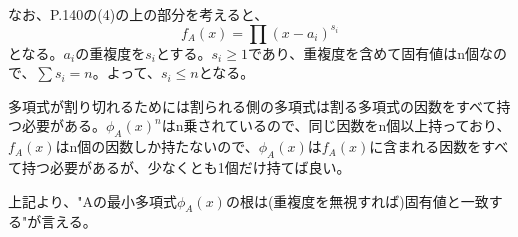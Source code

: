 \documentclass{jsarticle}
\begin{document}
なお、P.140の(4)の上の部分を考えると、
\begin{equation}
f_A(x) = \prod (x - a_i)^{s_i}
\end{equation}
となる。$a_i$の重複度を$s_i$とする。$s_i \geq 1$であり、重複度を含めて固有値はn個なので、$\sum s_i = n$。よって、$s_i \leq n$となる。

多項式が割り切れるためには割られる側の多項式は割る多項式の因数をすべて持つ必要がある。${\phi_A(x)}^n$はn乗されているので、同じ因数をn個以上持っており、$f_A(x)$はn個の因数しか持たないので、$\phi_A(x)$は$f_A(x)$に含まれる因数をすべて持つ必要があるが、少なくとも1個だけ持てば良い。

上記より、"Aの最小多項式$\phi_A(x)$の根は(重複度を無視すれば)固有値と一致する"が言える。
\end{document}
